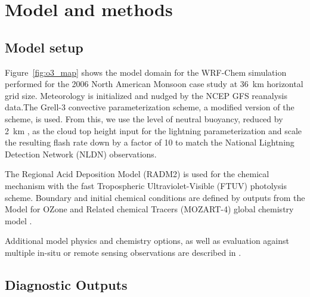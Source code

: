 \section{Model and methods}\label{sect:model}

\subsection{Model setup}

Figure~\ref{fig:o3_map} shows the model domain for the WRF-Chem simulation performed
for the 2006 North American Monsoon case study at 36~km horizontal grid size. Meteorology
is initialized and nudged by the NCEP GFS reanalysis data.The Grell-3 convective
parameterization scheme, a modified version of the \citet{Grell:2002bs} scheme, is used.
From this, we use the level of neutral buoyancy, reduced by 2~km \citep{Wong:2013vn},
as the cloud top height input for the
\citet{Price:1992wb} lightning parameterization and scale the resulting flash rate down by a factor of 10 to match
the National Lightning Detection Network  (NLDN) \citep{Cummins:2009aa} observations.

The Regional Acid Deposition Model (RADM2) \citep{Stockwell:1990ez} is used for
the chemical mechanism with the fast Tropospheric Ultraviolet-Visible (FTUV)
\citep{Tie:2003ve} photolysis scheme. Boundary and initial chemical conditions are defined
by outputs from the Model for OZone and Related chemical Tracers (MOZART-4)
global chemistry model \citep{Emmons:2010fk}.

Additional model physics and chemistry options, as well as evaluation against
multiple in-situ or remote sensing observations are described in
\citet[][manuscript in preparation]{Wong:2014xx}. %

\subsection{Diagnostic Outputs}

